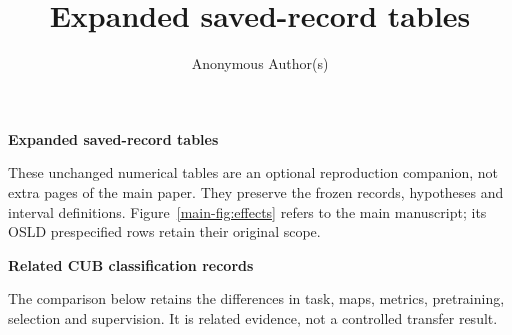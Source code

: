\documentclass[sigconf,anonymous,review]{acmart}
\title[Expanded saved-record tables]{Expanded saved-record tables}
\author{Anonymous Author(s)}
\begin{document}
\onecolumn
\begin{center}\large\bfseries Expanded saved-record tables\end{center}
These unchanged numerical tables are an optional reproduction companion,
not extra pages of the main paper. They preserve the frozen records,
hypotheses and interval definitions. Figure~\ref*{main-fig:effects} refers
to the main manuscript; its OSLD prespecified rows retain their original scope.
\par\smallskip
\noindent\begin{minipage}{\textwidth}\end{minipage}
\par\medskip
\noindent\begin{minipage}{\textwidth}\end{minipage}
\par\medskip
\noindent\begin{minipage}[t]{.485\textwidth}\end{minipage}\hfill
\begin{minipage}[t]{.485\textwidth}\end{minipage}
\newpage
\begin{center}\large\bfseries Related CUB classification records\end{center}
The comparison below retains the differences in task, maps, metrics,
pretraining, selection and supervision. It is related evidence, not a
controlled transfer result.
\par\medskip
\noindent\begin{minipage}[t]{.485\textwidth}

\par\medskip

\end{minipage}\hfill
\begin{minipage}[t]{.485\textwidth}\end{minipage}
\end{document}
